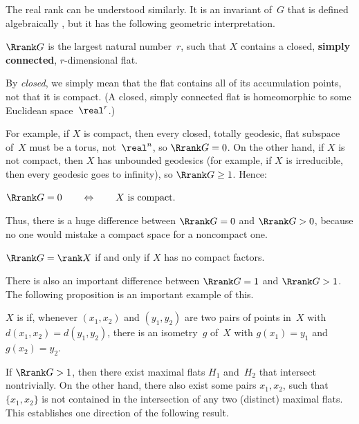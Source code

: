 The real rank can be understood similarly. It is an invariant of~$G$
that is defined algebraically , but it has the following geometric
interpretation.

\begin{thm} \label{Rrank-geometric}
 $\Rrank G$ is the largest natural number~$r$, such that
$X$ contains a closed, \textbf{simply connected}, $r$-dimensional
flat.
 \end{thm}
 
\begin{warn}
By \emph{closed}, we simply mean that the flat contains all of its accumulation points, not that it is compact. (A closed, simply connected flat is homeomorphic to some Euclidean space~$\real^r$.)
\end{warn}

For example, if $X$ is compact, then every closed, totally
geodesic, flat subspace of~$X$ must be a torus,
not~$\real^n$, so $\Rrank G = 0$. On the other hand, if $X$
is not compact, then $X$ has unbounded geodesics (for
example, if $X$ is irreducible, then every geodesic goes to
infinity), so $\Rrank G \ge 1$. Hence:
 \centerline{$\Rrank G = 0
  \qquad\Leftrightarrow \qquad 
  \text{$X$~is compact}
 .$}
 Thus, there is a huge difference between $\Rrank G = 0$
and $\Rrank G > 0$, because no one would mistake a
compact space for a noncompact one.

\begin{rem}
 $\Rrank G = \rank X$ if and only if $X$ has no compact
factors.
 \end{rem}

There is also an important difference between $\Rrank G =
1$ and $\Rrank G > 1$. The following proposition is an important
example of this.

\begin{defn}
 $X$ is  if, whenever $(x_1,x_2)$ and
$(y_1,y_2)$ are two pairs of points in~$X$ with $d(x_1,x_2) =
d(y_1,y_2)$, there is an isometry~$g$ of~$X$ with $g(x_1) = y_1$ and
$g(x_2) = y_2$.
 \end{defn}

If $\Rrank G > 1$, then there exist maximal flats $H_1$ and~$H_2$ that
intersect nontrivially. On the other hand, there also exist some pairs
$x_1,x_2$, such that $\{x_1,x_2\}$ is not contained in the intersection
of any two (distinct) maximal flats. This establishes one direction of
the following result.

